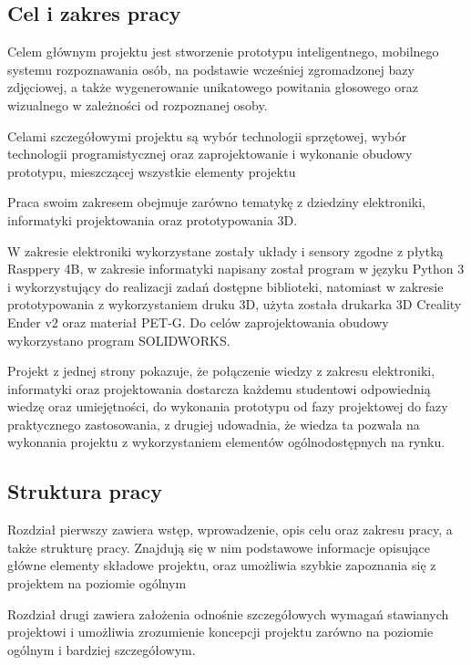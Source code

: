 \documentclass[a4paper,12pt,reqno]{article}
\begin{document}
\subsection{Cel i zakres pracy}

Celem głównym projektu jest stworzenie prototypu inteligentnego, mobilnego systemu rozpoznawania osób, na podstawie wcześniej zgromadzonej bazy zdjęciowej, a także wygenerowanie unikatowego powitania głosowego oraz wizualnego w zależności od rozpoznanej osoby.

Celami szczegółowymi projektu są wybór technologii sprzętowej, wybór technologii programistycznej oraz zaprojektowanie i wykonanie obudowy prototypu, mieszczącej wszystkie elementy projektu

Praca swoim zakresem obejmuje zarówno tematykę z dziedziny elektroniki, informatyki projektowania oraz prototypowania 3D.

W zakresie elektroniki wykorzystane zostały układy i sensory zgodne z płytką Rasppery 4B, w zakresie informatyki napisany został program w języku Python 3 i wykorzystujący do realizacji zadań dostępne biblioteki, natomiast w zakresie prototypowania z wykorzystaniem druku 3D, użyta została drukarka 3D Creality Ender v2 oraz materiał \textcolor{to_check_at_end}{PET-G}. Do celów zaprojektowania obudowy wykorzystano program SOLIDWORKS. %

Projekt z jednej strony pokazuje, że połączenie wiedzy z zakresu elektroniki, informatyki oraz projektowania dostarcza każdemu studentowi odpowiednią wiedzę oraz umiejętności, do wykonania prototypu od fazy projektowej do fazy praktycznego zastosowania,  z drugiej udowadnia, że wiedza ta pozwala na wykonania projektu z wykorzystaniem elementów ogólnodostępnych na rynku.

\subsection{Struktura pracy} %

Rozdział pierwszy zawiera wstęp, wprowadzenie, opis celu oraz zakresu pracy, a także strukturę pracy. Znajdują się w nim podstawowe informacje opisujące główne elementy składowe projektu, oraz umożliwia szybkie zapoznania się z projektem na poziomie ogólnym

Rozdział drugi zawiera założenia odnośnie szczegółowych wymagań stawianych projektowi i umożliwia zrozumienie koncepcji projektu zarówno na poziomie ogólnym i bardziej szczegółowym.
\end{document}
